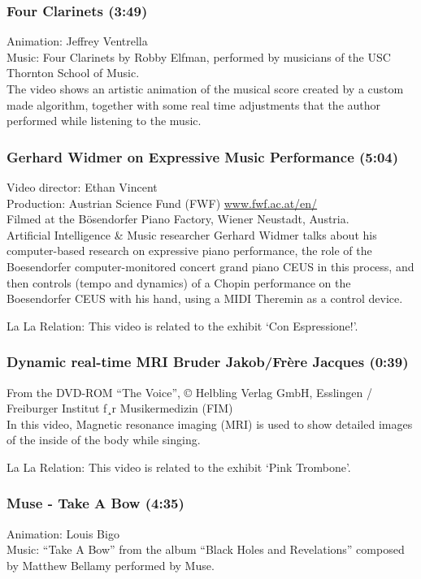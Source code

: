 \subsubsection*{Four Clarinets (3:49)}
Animation: Jeffrey Ventrella \\
Music: Four Clarinets by Robby Elfman, performed by musicians of the USC Thornton School of Music. \\

The video shows an artistic animation of the musical score created by a custom made algorithm, together with some real time adjustments that the author performed while listening to the music. 

\subsubsection*{Gerhard Widmer on Expressive Music Performance (5:04)}
Video director: Ethan Vincent \\
Production: Austrian Science Fund (FWF) \url{www.fwf.ac.at/en/} \\
Filmed at the Bösendorfer Piano Factory, Wiener Neustadt, Austria. \\

Artificial Intelligence \& Music researcher Gerhard Widmer talks about his computer-based research on expressive piano performance, the role of the Boesendorfer computer-monitored concert grand piano CEUS in this process, and then controls (tempo and dynamics) of a Chopin performance on the Boesendorfer CEUS with his hand, using a MIDI Theremin as a control device. 

La La Relation: This video is related to the exhibit `Con Espressione!'.

\subsubsection*{Dynamic real-time MRI Bruder Jakob/Frère Jacques (0:39)}
From the DVD-ROM ``The Voice'', © Helbling Verlag GmbH, Esslingen / Freiburger Institut f¸r Musikermedizin (FIM)\\

In this video, Magnetic resonance imaging (MRI) is used to show detailed images of the inside of the body while singing.

La La Relation: This video is related to the exhibit `Pink Trombone'.

\subsubsection*{Muse - Take A Bow (4:35)}
Animation: Louis Bigo \\
Music: ``Take A Bow'' from the album ``Black Holes and Revelations'' composed by Matthew Bellamy performed by Muse. \\

